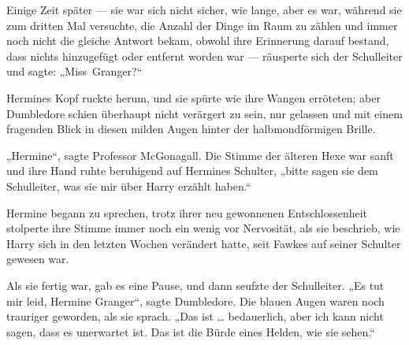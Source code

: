 Einige Zeit später — sie war sich nicht sicher, wie lange, aber es war, während sie zum dritten Mal versuchte, die Anzahl der Dinge im Raum zu zählen und immer noch nicht die gleiche Antwort bekam, obwohl ihre Erinnerung darauf bestand, dass nichts hinzugefügt oder entfernt worden war — räusperte sich der Schulleiter und sagte:
„Miss~Granger?“

Hermines Kopf ruckte herum, und sie spürte wie ihre Wangen erröteten; aber Dumbledore schien überhaupt nicht verärgert zu sein, nur gelassen und mit einem fragenden Blick in diesen milden Augen hinter der halbmondförmigen Brille.

„Hermine“, sagte Professor McGonagall. Die Stimme der älteren Hexe war sanft und ihre Hand ruhte beruhigend auf Hermines Schulter, „bitte sagen sie dem Schulleiter, was sie mir über Harry erzählt haben.“

Hermine begann zu sprechen, trotz ihrer neu gewonnenen Entschlossenheit stolperte ihre Stimme immer noch ein wenig vor Nervosität, als sie beschrieb, wie Harry sich in den letzten Wochen verändert hatte, seit Fawkes auf seiner Schulter gewesen war.

Als sie fertig war, gab es eine Pause, und dann seufzte der Schulleiter.
„Es tut mir leid, Hermine Granger“, sagte Dumbledore. Die blauen Augen waren noch trauriger geworden, als sie sprach.
„Das ist … bedauerlich, aber ich kann nicht sagen, dass es unerwartet ist. Das ist die Bürde eines Helden, wie sie sehen.“

